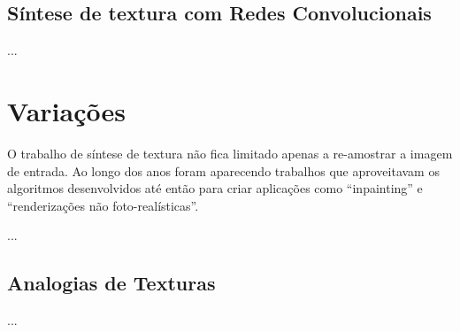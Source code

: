 










\section{Síntese de textura com Redes Convolucionais}

...







\iffalse
\chapter{Variações}

O trabalho de síntese de textura
não fica limitado apenas a re-amostrar
a imagem de entrada. Ao longo
dos anos foram aparecendo trabalhos
que aproveitavam os algoritmos
desenvolvidos até então para
criar aplicações como ``inpainting''
e ``renderizações não foto-realísticas''.

...

\section{Analogias de Texturas}

\cite{Hertzmann2001}

...

